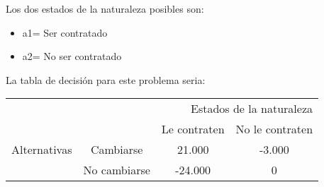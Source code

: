 \documentclass[12pt]{article}
\begin{document}
Los dos estados de la naturaleza posibles son:\\

\begin{itemize}

\item a1= Ser contratado
\item a2= No ser contratado

\end{itemize}

La tabla de decisión para este problema seria:

\begin{tabular}{c|c|c|c|}
\multicolumn{4}{r}{Estados de la naturaleza} \\
\cline{2-4}
\multirow{3}{*}{Alternativas} & & Le contraten & No le contraten \\
\cline{2-4}
 & Cambiarse & 21.000 & -3.000\\
\cline{2-4}
 & No cambiarse & -24.000 & 0 \\
\cline{2-4}
\end{tabular}
\end{document}
